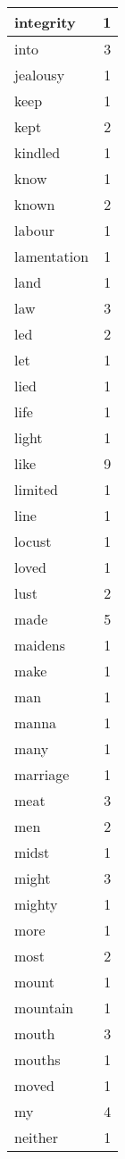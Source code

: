 \begin{center}
\begin{longtable}{l|r}
integrity & 1\\ \hline 
into & 3\\ \hline 
jealousy & 1\\ \hline 
keep & 1\\ \hline 
kept & 2\\ \hline 
kindled & 1\\ \hline 
know & 1\\ \hline 
known & 2\\ \hline 
labour & 1\\ \hline 
lamentation & 1\\ \hline 
land & 1\\ \hline 
law & 3\\ \hline 
led & 2\\ \hline 
let & 1\\ \hline 
lied & 1\\ \hline 
life & 1\\ \hline 
light & 1\\ \hline 
like & 9\\ \hline 
limited & 1\\ \hline 
line & 1\\ \hline 
locust & 1\\ \hline 
loved & 1\\ \hline 
lust & 2\\ \hline 
made & 5\\ \hline 
maidens & 1\\ \hline 
make & 1\\ \hline 
man & 1\\ \hline 
manna & 1\\ \hline 
many & 1\\ \hline 
marriage & 1\\ \hline 
meat & 3\\ \hline 
men & 2\\ \hline 
midst & 1\\ \hline 
might & 3\\ \hline 
mighty & 1\\ \hline 
more & 1\\ \hline 
most & 2\\ \hline 
mount & 1\\ \hline 
mountain & 1\\ \hline 
mouth & 3\\ \hline 
mouths & 1\\ \hline 
moved & 1\\ \hline 
my & 4\\ \hline 
neither & 1\\ \hline 

\end{longtable}
\end{center}
